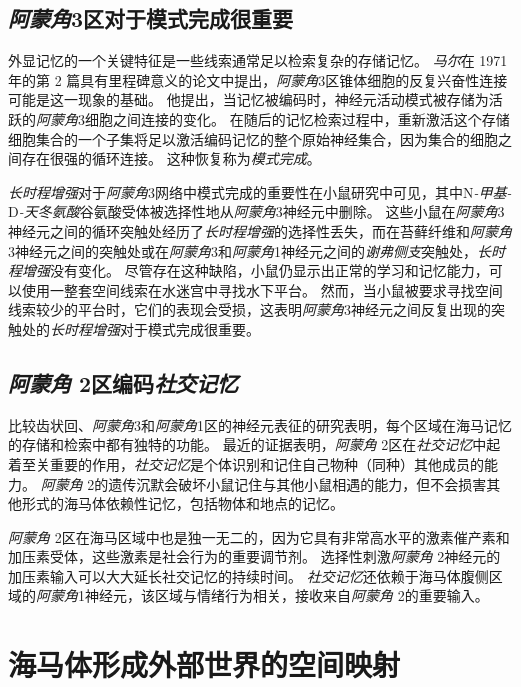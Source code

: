 \subsection{\textit{阿蒙角}3区对于模式完成很重要}

外显记忆的一个关键特征是一些线索通常足以检索复杂的存储记忆。
\textit{马尔}在 1971 年的第 2 篇具有里程碑意义的论文中提出，\textit{阿蒙角}3区锥体细胞的反复兴奋性连接可能是这一现象的基础\cite{marr1991simple}。
他提出，当记忆被编码时，神经元活动模式被存储为活跃的\textit{阿蒙角}3细胞之间连接的变化。
在随后的记忆检索过程中，重新激活这个存储细胞集合的一个子集将足以激活编码记忆的整个原始神经集合，因为集合的细胞之间存在很强的循环连接。
这种恢复称为\textit{模式完成}。


\textit{长时程增强}对于\textit{阿蒙角}3网络中模式完成的重要性在小鼠研究中可见，其中N\textit{-甲基-}D\textit{-天冬氨酸}谷氨酸受体被选择性地从\textit{阿蒙角}3神经元中删除。
这些小鼠在\textit{阿蒙角}3神经元之间的循环突触处经历了\textit{长时程增强}的选择性丢失，而在苔藓纤维和\textit{阿蒙角}3神经元之间的突触处或在\textit{阿蒙角}3和\textit{阿蒙角}1神经元之间的\textit{谢弗侧支}突触处，\textit{长时程增强}没有变化。
尽管存在这种缺陷，小鼠仍显示出正常的学习和记忆能力，可以使用一整套空间线索在水迷宫中寻找水下平台。
然而，当小鼠被要求寻找空间线索较少的平台时，它们的表现会受损，这表明\textit{阿蒙角}3神经元之间反复出现的突触处的\textit{长时程增强}对于模式完成很重要。



\subsection{\textit{阿蒙角} 2区编码\textit{社交记忆}}

比较齿状回、\textit{阿蒙角}3和\textit{阿蒙角}1区的神经元表征的研究表明，每个区域在海马记忆的存储和检索中都有独特的功能。
最近的证据表明，\textit{阿蒙角} 2区在\textit{社交记忆}中起着至关重要的作用，\textit{社交记忆}是个体识别和记住自己物种（同种）其他成员的能力。
\textit{阿蒙角} 2的遗传沉默会破坏小鼠记住与其他小鼠相遇的能力，但不会损害其他形式的海马体依赖性记忆，包括物体和地点的记忆。


\textit{阿蒙角} 2区在海马区域中也是独一无二的，因为它具有非常高水平的激素催产素和加压素受体，这些激素是社会行为的重要调节剂。
选择性刺激\textit{阿蒙角} 2神经元的加压素输入可以大大延长社交记忆的持续时间。
\textit{社交记忆}还依赖于海马体腹侧区域的\textit{阿蒙角}1神经元，该区域与情绪行为相关，接收来自\textit{阿蒙角} 2的重要输入。



\section{海马体形成外部世界的空间映射}

